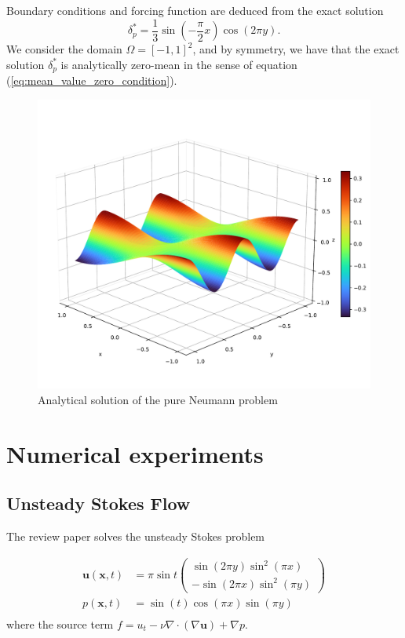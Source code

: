 
Boundary conditions and forcing function are deduced from the exact solution
\begin{equation}
    \delta_p^* = \frac{1}{3} \sin\left(-\frac{\pi}{2} x \right) \cos\left(2\pi y\right).
\end{equation}
We consider the domain $\Omega = [-1, 1]^2$, and by symmetry, we have that the exact solution $\delta_p^*$ is analytically zero-mean in the sense of equation (\ref{eq:mean_value_zero_condition}).

\begin{figure}[htpb]
  \centering
  \includegraphics[width=0.5\linewidth]{img/dp_study_analytical.pdf}
  \caption{Analytical solution of the pure Neumann problem}
  \label{fig:dp_neumann_problem_analytical}
\end{figure}

\section{Numerical experiments}
\label{sec:numerical_experiments}

\subsection{Unsteady Stokes Flow}

The review paper \cite{guermond_overview_2006} solves the unsteady Stokes problem

\begin{equation}
  \begin{aligned}
    \bm{u}(\bm{x}, t) &= \pi \sin t 
    \begin{pmatrix}
      \sin( 2\pi y) \sin^2( \pi x) \\
      -\sin(2 \pi x) \sin^2(\pi y)
    \end{pmatrix} \\
    p(\bm{x}, t) &= \sin(t)\cos(\pi x) \sin(\pi y)\\
  \end{aligned}
  \label{eq:MS_stokes_guermond}
\end{equation}
where the source term $f= u_t -\nu \nabla \cdot( \nabla \bm{u} ) + \nabla p $.

